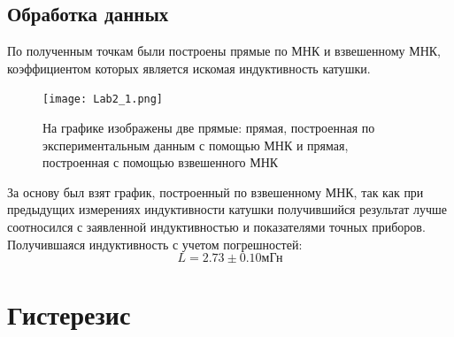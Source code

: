 \documentclass[a4paper,14pt]{extarticle}
\begin{document}
	\subsection{Обработка данных}
	По полученным точкам были построены прямые по МНК и взвешенному МНК, коэффициентом которых является искомая индуктивность катушки.
	\begin{figure}[h]
		\centering
		\texttt{[image: Lab2\_1.png]}
		\caption{На графике изображены две прямые: прямая, построенная по экспериментальным данным с помощью МНК и прямая, построенная с помощью взвешенного МНК}
		\label{fig2}
	\end{figure} 
	\newpage
	За основу был взят график, построенный по взвешенному МНК, так как при предыдущих измерениях индуктивности катушки получившийся результат лучше соотносился с заявленной индуктивностью и показателями точных приборов. Получившаяся индуктивность с учетом погрешностей:
	\begin{equation}
	L = 2.73 \pm 0.10\text{мГн}
	\end{equation}
	\section{Гистерезис}
\end{document}
